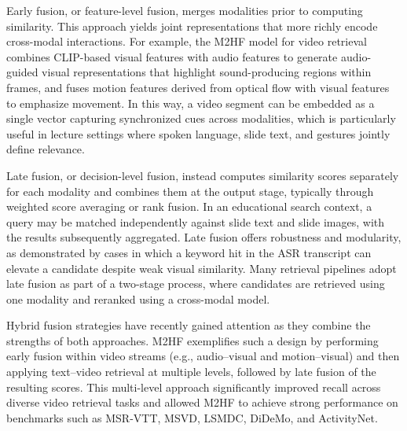 Early fusion, or feature-level fusion, merges modalities prior to computing similarity. This approach yields joint representations that more richly encode cross-modal interactions. For example, the M2HF model for video retrieval combines CLIP-based visual features with audio features to generate audio-guided visual representations that highlight sound-producing regions within frames, and fuses motion features derived from optical flow with visual features to emphasize movement. In this way, a video segment can be embedded as a single vector capturing synchronized cues across modalities, which is particularly useful in lecture settings where spoken language, slide text, and gestures jointly define relevance.

Late fusion, or decision-level fusion, instead computes similarity scores separately for each modality and combines them at the output stage, typically through weighted score averaging or rank fusion. In an educational search context, a query may be matched independently against slide text and slide images, with the results subsequently aggregated. Late fusion offers robustness and modularity, as demonstrated by cases in which a keyword hit in the ASR transcript can elevate a candidate despite weak visual similarity. Many retrieval pipelines adopt late fusion as part of a two-stage process, where candidates are retrieved using one modality and reranked using a cross-modal model.

Hybrid fusion strategies have recently gained attention as they combine the strengths of both approaches. M2HF exemplifies such a design by performing early fusion within video streams (e.g., audio–visual and motion–visual) and then applying text–video retrieval at multiple levels, followed by late fusion of the resulting scores. This multi-level approach significantly improved recall across diverse video retrieval tasks and allowed M2HF to achieve strong performance on benchmarks such as MSR-VTT, MSVD, LSMDC, DiDeMo, and ActivityNet.

